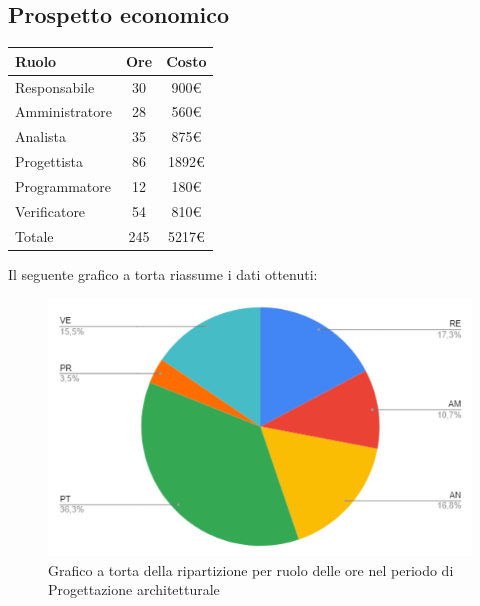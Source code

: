 {{{{{\subsection{Prospetto economico}\label{PreventivoFaseDiProgettazioneArchitetturaleProspettoEconomico}
\quad
\def\tabularxcolumn#1{m{#1}}
{
	\begin{center}
		\renewcommand{\arraystretch}{1.4}
		\begin{tabularx}{7cm}{|X|c|c|}
			\hline
			\rowcolor{airforceblue}
			\textbf{Ruolo} & \textbf{Ore} & \textbf{Costo}\\
			\hline
			Responsabile & 30 & 900\euro\\
			\hline
			Amministratore & 28 & 560\euro\\
			\hline
			Analista & 35 & 875\euro\\
			\hline
			Progettista & 86 & 1892\euro\\
			\hline
			Programmatore & 12 & 180\euro\\
			\hline
			Verificatore & 54 & 810\euro\\
			\hline
			Totale & 245 & 5217\euro\\
			\hline
		\end{tabularx} 
	\end{center}

Il seguente grafico a torta riassume i dati ottenuti:
\begin{figure}[!ht]
	\begin{center}
		\includegraphics[width=0.8\linewidth]{../immagini/pdp/torta_progettazione_architetturale.png}
		\caption{Grafico a torta della ripartizione per ruolo delle ore nel periodo di Progettazione architetturale}
	\end{center}
\end{figure}

}}}}}}
